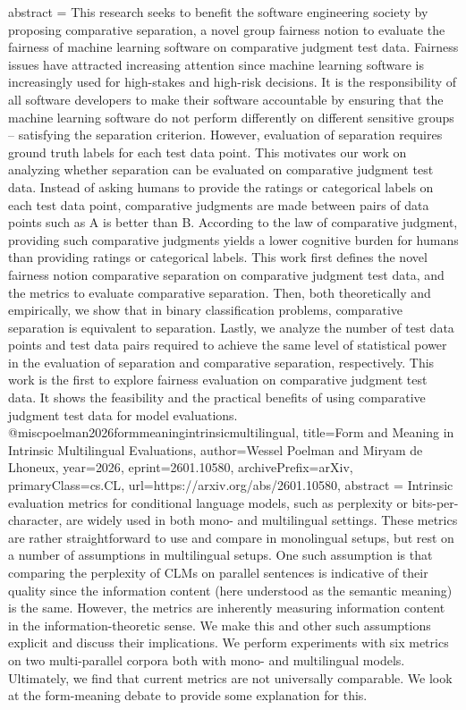 {      abstract = {This research seeks to benefit the software engineering society by proposing comparative separation, a novel group fairness notion to evaluate the fairness of machine learning software on comparative judgment test data. Fairness issues have attracted increasing attention since machine learning software is increasingly used for high-stakes and high-risk decisions. It is the responsibility of all software developers to make their software accountable by ensuring that the machine learning software do not perform differently on different sensitive groups -- satisfying the separation criterion. However, evaluation of separation requires ground truth labels for each test data point. This motivates our work on analyzing whether separation can be evaluated on comparative judgment test data. Instead of asking humans to provide the ratings or categorical labels on each test data point, comparative judgments are made between pairs of data points such as A is better than B. According to the law of comparative judgment, providing such comparative judgments yields a lower cognitive burden for humans than providing ratings or categorical labels. This work first defines the novel fairness notion comparative separation on comparative judgment test data, and the metrics to evaluate comparative separation. Then, both theoretically and empirically, we show that in binary classification problems, comparative separation is equivalent to separation. Lastly, we analyze the number of test data points and test data pairs required to achieve the same level of statistical power in the evaluation of separation and comparative separation, respectively. This work is the first to explore fairness evaluation on comparative judgment test data. It shows the feasibility and the practical benefits of using comparative judgment test data for model evaluations.}
}@misc{poelman2026formmeaningintrinsicmultilingual,
      title={Form and Meaning in Intrinsic Multilingual Evaluations}, 
      author={Wessel Poelman and Miryam de Lhoneux},
      year={2026},
      eprint={2601.10580},
      archivePrefix={arXiv},
      primaryClass={cs.CL},
      url={https://arxiv.org/abs/2601.10580},
      abstract = {Intrinsic evaluation metrics for conditional language models, such as perplexity or bits-per-character, are widely used in both mono- and multilingual settings. These metrics are rather straightforward to use and compare in monolingual setups, but rest on a number of assumptions in multilingual setups. One such assumption is that comparing the perplexity of CLMs on parallel sentences is indicative of their quality since the information content (here understood as the semantic meaning) is the same. However, the metrics are inherently measuring information content in the information-theoretic sense. We make this and other such assumptions explicit and discuss their implications. We perform experiments with six metrics on two multi-parallel corpora both with mono- and multilingual models. Ultimately, we find that current metrics are not universally comparable. We look at the form-meaning debate to provide some explanation for this.}
}
